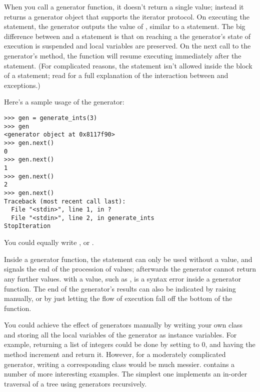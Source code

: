 \documentclass{howto}
\begin{document}
When you call a generator function, it doesn't return a single value;
instead it returns a generator object that supports the iterator
protocol.  On executing the  statement, the generator
outputs the value of , similar to a 
statement.  The big difference between  and a
 statement is that on reaching a  the
generator's state of execution is suspended and local variables are
preserved.  On the next call to the generator's  method,
the function will resume executing immediately after the
 statement.  (For complicated reasons, the
 statement isn't allowed inside the  block
of a  statement; read  for a full
explanation of the interaction between  and
exceptions.)

Here's a sample usage of the  generator:

\begin{verbatim}
>>> gen = generate_ints(3)
>>> gen
<generator object at 0x8117f90>
>>> gen.next()
0
>>> gen.next()
1
>>> gen.next()
2
>>> gen.next()
Traceback (most recent call last):
  File "<stdin>", line 1, in ?
  File "<stdin>", line 2, in generate_ints
StopIteration
\end{verbatim}

You could equally write , or
.

Inside a generator function, the  statement can only
be used without a value, and signals the end of the procession of
values; afterwards the generator cannot return any further values.
 with a value, such as , is a syntax
error inside a generator function.  The end of the generator's results
can also be indicated by raising  manually,
or by just letting the flow of execution fall off the bottom of the
function.

You could achieve the effect of generators manually by writing your
own class and storing all the local variables of the generator as
instance variables.  For example, returning a list of integers could
be done by setting  to 0, and having the
 method increment  and return it.
However, for a moderately complicated generator, writing a
corresponding class would be much messier.
 contains a number of more
interesting examples.  The simplest one implements an in-order
traversal of a tree using generators recursively.
\end{document}
